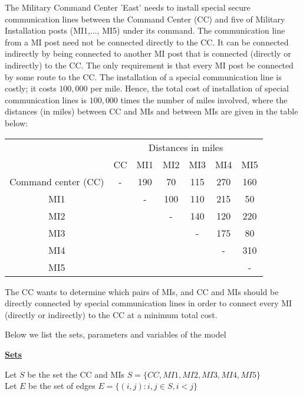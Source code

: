 \documentclass[12pt]{exam}
\begin{document}
\begin{questions}
\question The Military Command Center 'East'  needs to install special secure communication lines between the Command Center (CC) and five of Military Installation posts (MI1,..., MI5) under its command. The  communication line from a  MI post need not be connected directly to the  CC. It can be connected indirectly by being connected to another MI post that is connected (directly or indirectly) to the CC. The only requirement is that every MI post  be connected by some route to the CC.
The  installation of a special communication line is  costly; it costs $100,000$   per  mile. Hence, the total cost of installation of special communication lines is $100,000$ times the number of miles involved, where the distances (in miles) between CC and MIs and between MIs  are  given in the table below:

\begin{center}
\begin{tabular}{c|cccccc}
\hline
                         & \multicolumn{6}{c}{Distances in miles}  \\
                         &  CC       & MI1  & MI2  & MI3  & MI4  & MI5  \\ \hline
Command center (CC)      &  -        & 190  & 70   & 115  & 270  & 160   \\
 MI1                     &           & -    & 100  & 110  & 215  & 50    \\
 MI2                     &           &      & -    & 140  & 120  & 220    \\
 MI3                     &           &      &      & -    & 175  & 80   \\ 
 MI4                     &           &      &      &      & -    & 310  \\
 MI5                     &           &      &      &      &      & -  \\ \hline
\end{tabular}
\end{center}

The CC wants to determine which pairs of MIs, and CC and MIs should be
directly connected by special  communication lines in order to connect every
MI (directly or indirectly) to the CC at a minimum total cost.

Below we list the sets, parameters and variables of the  model

\textbf{\underline{Sets}}

Let $S$ be the set the CC and MIs $S = \{CC, MI1, MI2, MI3, MI4, MI5 \}$ \\
Let $E$ be the set of edges $E = \{(i,j) : i, j \in S, i< j\}$ \\


\end{questions}
\end{document}
